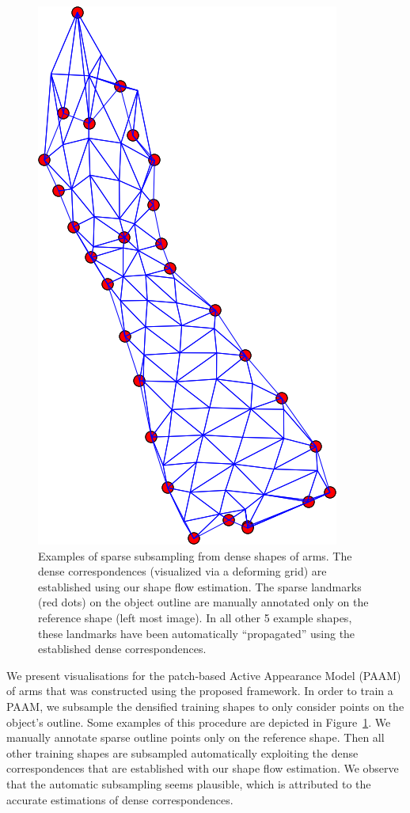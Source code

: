 \begin{figure}
        \includegraphics[height=\ofh]{resources/Annotation_Correction/Suplementory_Meterial/SparseSamples/mean-4.png}
    \caption{Examples of sparse subsampling from dense shapes of arms. The dense correspondences (visualized via a deforming grid) are established using our shape flow estimation. The sparse landmarks (red dots) on the object outline are manually annotated only on the reference shape (left most image). In all other 5 example shapes, these landmarks have been automatically ``propagated'' using the established dense correspondences.}
    \label{fig:sparsesample}
\end{figure}

We present visualisations for the patch-based Active Appearance Model (PAAM) of arms that was constructed using the proposed framework. In order to train a PAAM, we subsample the densified training shapes to only consider points on the object's outline. Some examples of this procedure are depicted in Figure~\ref{fig:sparsesample}. We manually annotate sparse outline points only on the reference shape. Then all other training shapes are subsampled automatically exploiting the dense correspondences that are established with our shape flow estimation. We observe that the automatic subsampling seems plausible, which is attributed to the accurate estimations of dense correspondences.

